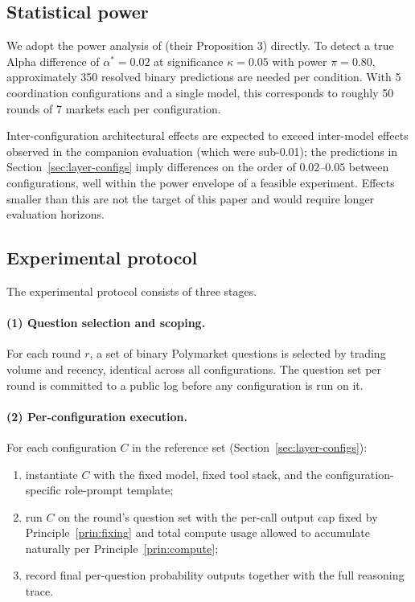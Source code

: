 \documentclass[11pt]{article}
\begin{document}
\subsection{Statistical power}
\label{sec:method-power}

We adopt the power analysis of \citet{nechepurenko2026foresight} (their Proposition 3) directly. To detect a true Alpha difference of $\alpha^* = 0.02$ at significance $\kappa = 0.05$ with power $\pi = 0.80$, approximately 350 resolved binary predictions are needed per condition. With 5 coordination configurations and a single model, this corresponds to roughly 50 rounds of 7 markets each per configuration.

Inter-configuration architectural effects are expected to exceed inter-model effects observed in the companion evaluation (which were sub-0.01); the predictions in Section~\ref{sec:layer-configs} imply differences on the order of $0.02$--$0.05$ between configurations, well within the power envelope of a feasible experiment. Effects smaller than this are not the target of this paper and would require longer evaluation horizons.

\subsection{Experimental protocol}
\label{sec:method-protocol}

The experimental protocol consists of three stages.

\paragraph{(1) Question selection and scoping.}
For each round $r$, a set of binary Polymarket questions is selected by trading volume and recency, identical across all configurations. The question set per round is committed to a public log before any configuration is run on it.

\paragraph{(2) Per-configuration execution.}
For each configuration $C$ in the reference set (Section~\ref{sec:layer-configs}):
\begin{enumerate}[label=(\alph*)]
\item instantiate $C$ with the fixed model, fixed tool stack, and the configuration-specific role-prompt template;
\item run $C$ on the round's question set with the per-call output cap fixed by Principle~\ref{prin:fixing} and total compute usage allowed to accumulate naturally per Principle~\ref{prin:compute};
\item record final per-question probability outputs together with the full reasoning trace.
\end{enumerate}
\end{document}
